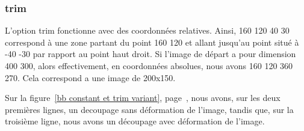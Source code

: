 \subsubsection{trim}
L'option trim fonctionne avec des coordonnées relatives.
Ainsi, {160 120 40 30} correspond à une zone partant du point {160 120}
et allant jusqu'au point situé à {-40 -30} par rapport au point haut droit.
Si l'image de départ a pour dimension {400 300}, alors effectivement, 
en coordonnées absolues, nous avons {160 120 360 270}.
Cela correspond a une image de 200x150.

Sur la figure~\ref{bb constant et trim variant}, page~\pageref{bb constant et trim variant},
nous avons, sur les deux premières lignes, un decoupage sans déformation de l'image, 
tandis que, sur la troisième ligne, nous avons un découpage avec déformation de l'image.

